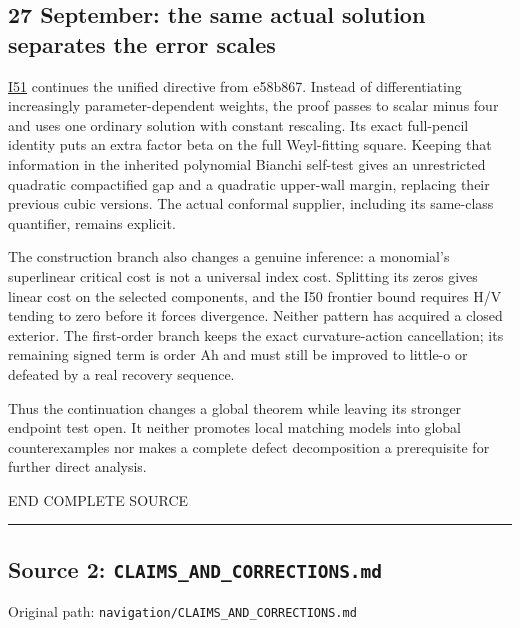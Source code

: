 \documentclass[
  10pt,
]{article}
\begin{document}
\hypertarget{september-the-same-actual-solution-separates-the-error-scales}{%
\subsection{27 September: the same actual solution separates the error
scales}\label{september-the-same-actual-solution-separates-the-error-scales}}

\href{../continuation/20260927_constant_weight_and_global_fit.md}{I51}
continues the unified directive from e58b867. Instead of differentiating
increasingly parameter-dependent weights, the proof passes to scalar
minus four and uses one ordinary solution with constant rescaling. Its
exact full-pencil identity puts an extra factor beta on the full
Weyl-fitting square. Keeping that information in the inherited
polynomial Bianchi self-test gives an unrestricted quadratic
compactified gap and a quadratic upper-wall margin, replacing their
previous cubic versions. The actual conformal supplier, including its
same-class quantifier, remains explicit.

The construction branch also changes a genuine inference: a monomial's
superlinear critical cost is not a universal index cost. Splitting its
zeros gives linear cost on the selected components, and the I50 frontier
bound requires H/V tending to zero before it forces divergence. Neither
pattern has acquired a closed exterior. The first-order branch keeps the
exact curvature-action cancellation; its remaining signed term is order
Ah and must still be improved to little-o or defeated by a real recovery
sequence.

Thus the continuation changes a global theorem while leaving its
stronger endpoint test open. It neither promotes local matching models
into global counterexamples nor makes a complete defect decomposition a
prerequisite for further direct analysis.

END COMPLETE SOURCE

\begin{center}\rule{0.5\linewidth}{0.5pt}\end{center}

\hypertarget{source-2-claims_and_corrections.md}{%
\subsection{Source 2:
\nolinkurl{CLAIMS_AND_CORRECTIONS.md}}\label{source-2-claims_and_corrections.md}}

Original path: \nolinkurl{navigation/CLAIMS_AND_CORRECTIONS.md}
\end{document}
